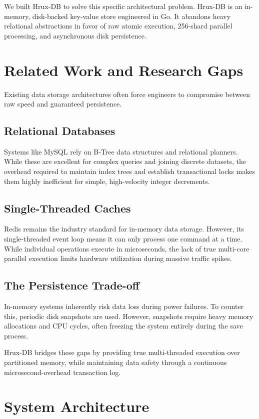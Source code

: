 \documentclass[10pt,twocolumn,letterpaper]{article}
\begin{document}
We built Hrux-DB to solve this specific architectural problem. Hrux-DB is an in-memory, disk-backed key-value store engineered in Go. It abandons heavy relational abstractions in favor of raw atomic execution, 256-shard parallel processing, and asynchronous disk persistence.

\section{Related Work and Research Gaps}

Existing data storage architectures often force engineers to compromise between raw speed and guaranteed persistence.

\subsection{Relational Databases}
Systems like MySQL rely on B-Tree data structures and relational planners. While these are excellent for complex queries and joining discrete datasets, the overhead required to maintain index trees and establish transactional locks makes them highly inefficient for simple, high-velocity integer decrements. 

\subsection{Single-Threaded Caches}
Redis remains the industry standard for in-memory data storage. However, its single-threaded event loop means it can only process one command at a time. While individual operations execute in microseconds, the lack of true multi-core parallel execution limits hardware utilization during massive traffic spikes. 

\subsection{The Persistence Trade-off}
In-memory systems inherently risk data loss during power failures. To counter this, periodic disk snapshots are used. However, snapshots require heavy memory allocations and CPU cycles, often freezing the system entirely during the save process. 

Hrux-DB bridges these gaps by providing true multi-threaded execution over partitioned memory, while maintaining data safety through a continuous microsecond-overhead transaction log.

\section{System Architecture}
\end{document}
